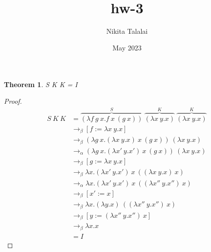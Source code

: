 \documentclass[a4paper, 12pt]{article}
\title{hw-3}
\author{Nikita Talalai}
\date{May 2023}
\newtheorem*{thm}{Theorem}
\begin{document}
    \maketitle


        \begin{thm}
            S K K = I
        \end{thm}
        
        \begin{proof}
            \begin{equation*}\label{xx}
                \begin{split}
                    S\ K\ K& = \overbrace{(\lambda f\ g\ x.f\ x\ (g\ x))}^{S}\
                    \overbrace{(\lambda x\ y.x)}^{K}\ \overbrace{(\lambda x\ y.x)}^{K}\\
                    & \to_\beta [f := \lambda x\ y.x]\\
                    & \to_\beta (\lambda g\ x.(\lambda x\ y.x)\ x\ (g\ x))\  (\lambda x\ y.x)\\
                    & \to_\alpha (\lambda g\ x.(\lambda x'\ y.x')\ x\ (g\ x))\  (\lambda x\ y.x)\\
                    & \to_\beta [g := \lambda x\ y.x]\\ 
                    & \to_\beta \lambda x.(\lambda x'\ y.x')\ x\ ((\lambda x\ y.x)\ x)\\
                    & \to_\alpha \lambda x.(\lambda x'\ y.x')\ x\ ((\lambda x''\ y.x'')\ x)\\
                    & \to_\beta [x' := x]\\
                    & \to_\beta \lambda x.(\lambda y.x)\ ((\lambda x''\ y.x'')\ x)\\
                    & \to_\beta [y := (\lambda x''\ y.x'')\ x]\\
                    & \to_\beta \lambda x.x\\
                    & = I
                \end{split}
            \end{equation*}
        \end{proof}
    
\end{document}

